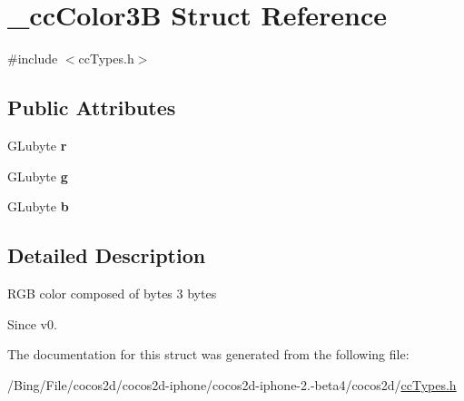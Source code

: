 \hypertarget{struct__cc_color3_b}{\section{\-\_\-cc\-Color3\-B Struct Reference}
\label{struct__cc_color3_b}
}


{\ttfamily \#include $<$cc\-Types.\-h$>$}

\subsection*{Public Attributes}
\begin{DoxyCompactItemize}
\item 
\hypertarget{struct__cc_color3_b_abda5d10f09d1e61b9b6bfeaf87f99f60}{G\-Lubyte {\bfseries r}}\label{struct__cc_color3_b_abda5d10f09d1e61b9b6bfeaf87f99f60}

\item 
\hypertarget{struct__cc_color3_b_a37dfac6d3bfb3eed1c76a8fef8cdee31}{G\-Lubyte {\bfseries g}}\label{struct__cc_color3_b_a37dfac6d3bfb3eed1c76a8fef8cdee31}

\item 
\hypertarget{struct__cc_color3_b_a3a73af521a35f507dd34b169112c6fe4}{G\-Lubyte {\bfseries b}}\label{struct__cc_color3_b_a3a73af521a35f507dd34b169112c6fe4}

\end{DoxyCompactItemize}


\subsection{Detailed Description}
R\-G\-B color composed of bytes 3 bytes \begin{DoxySince}{Since}
v0. 
\end{DoxySince}


The documentation for this struct was generated from the following file\-:\begin{DoxyCompactItemize}
\item 
/\-Bing/\-File/cocos2d/cocos2d-\/iphone/cocos2d-\/iphone-\/2.-\/beta4/cocos2d/\hyperlink{cc_types_8h}{cc\-Types.\-h}\end{DoxyCompactItemize}

